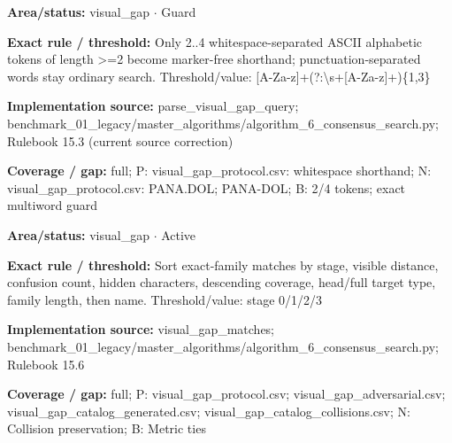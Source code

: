 \begin{tcolorbox}[enhanced,breakable,colback=white,colframe=Muted!45,boxrule=0.45pt,arc=1.5pt,left=6pt,right=6pt,top=5pt,bottom=5pt,title={\texttt{VG-SHORTHAND-WHITESPACE-04}},title after break={\texttt{VG-SHORTHAND-WHITESPACE-04}\ (continued)},fonttitle=\headingfont\bfseries\color{Navy},coltitle=Navy]
\textbf{Area/status:} visual\_\allowbreak{}gap $\boldsymbol{\cdot}$ Guard\par
\smallskip
\textbf{Exact rule / threshold:} Only 2..4 whitespace-separated ASCII alphabetic tokens of length >=2 become marker-free shorthand; punctuation-separated words stay ordinary search. Threshold/\allowbreak{}value: [A-Za-z]+(?:\textbackslash{}s+[A-Za-z]+)\{1,3\}\par
\smallskip
\textbf{Implementation source:} parse\_\allowbreak{}visual\_\allowbreak{}gap\_\allowbreak{}query; benchmark\_\allowbreak{}01\_\allowbreak{}legacy/\allowbreak{}master\_\allowbreak{}algorithms/\allowbreak{}algorithm\_\allowbreak{}6\_\allowbreak{}consensus\_\allowbreak{}search.py; Rulebook 15.3 (current source correction)\par
\smallskip
\textbf{Coverage / gap:} full; P: visual\_\allowbreak{}gap\_\allowbreak{}protocol.csv: whitespace shorthand; N: visual\_\allowbreak{}gap\_\allowbreak{}protocol.csv: PANA.DOL; PANA-DOL; B: 2/\allowbreak{}4 tokens; exact multiword guard
\end{tcolorbox}
\begin{tcolorbox}[enhanced,breakable,colback=white,colframe=Muted!45,boxrule=0.45pt,arc=1.5pt,left=6pt,right=6pt,top=5pt,bottom=5pt,title={\texttt{VG-SORT-13}},title after break={\texttt{VG-SORT-13}\ (continued)},fonttitle=\headingfont\bfseries\color{Navy},coltitle=Navy]
\textbf{Area/status:} visual\_\allowbreak{}gap $\boldsymbol{\cdot}$ Active\par
\smallskip
\textbf{Exact rule / threshold:} Sort exact-family matches by stage, visible distance, confusion count, hidden characters, descending coverage, head/\allowbreak{}full target type, family length, then name. Threshold/\allowbreak{}value: stage 0/\allowbreak{}1/\allowbreak{}2/\allowbreak{}3\par
\smallskip
\textbf{Implementation source:} visual\_\allowbreak{}gap\_\allowbreak{}matches; benchmark\_\allowbreak{}01\_\allowbreak{}legacy/\allowbreak{}master\_\allowbreak{}algorithms/\allowbreak{}algorithm\_\allowbreak{}6\_\allowbreak{}consensus\_\allowbreak{}search.py; Rulebook 15.6\par
\smallskip
\textbf{Coverage / gap:} full; P: visual\_\allowbreak{}gap\_\allowbreak{}protocol.csv; visual\_\allowbreak{}gap\_\allowbreak{}adversarial.csv; visual\_\allowbreak{}gap\_\allowbreak{}catalog\_\allowbreak{}generated.csv; visual\_\allowbreak{}gap\_\allowbreak{}catalog\_\allowbreak{}collisions.csv; N: Collision preservation; B: Metric ties
\end{tcolorbox}
